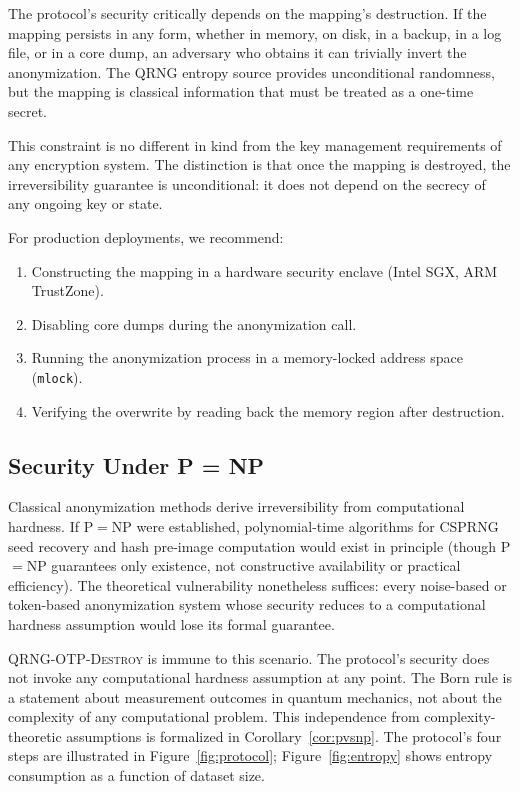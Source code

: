 \documentclass[journal]{IEEEtran}
\begin{document}
The protocol's security critically depends on the mapping's destruction. If the mapping persists in any form, whether in memory, on disk, in a backup, in a log file, or in a core dump, an adversary who obtains it can trivially invert the anonymization. The QRNG entropy source provides unconditional randomness, but the mapping is classical information that must be treated as a one-time secret.

This constraint is no different in kind from the key management requirements of any encryption system. The distinction is that once the mapping is destroyed, the irreversibility guarantee is unconditional: it does not depend on the secrecy of any ongoing key or state.

For production deployments, we recommend:
\begin{enumerate}
\item Constructing the mapping in a hardware security enclave (Intel SGX, ARM TrustZone).
\item Disabling core dumps during the anonymization call.
\item Running the anonymization process in a memory-locked address space (\texttt{mlock}).
\item Verifying the overwrite by reading back the memory region after destruction.
\end{enumerate}

\subsection{Security Under P = NP}
\label{subsec:pnp}

Classical anonymization methods derive irreversibility from computational hardness. If P$=$NP were established, polynomial-time algorithms for CSPRNG seed recovery and hash pre-image computation would exist in principle (though P$=$NP guarantees only existence, not constructive availability or practical efficiency). The theoretical vulnerability nonetheless suffices: every noise-based or token-based anonymization system whose security reduces to a computational hardness assumption would lose its formal guarantee.

\textsc{QRNG-OTP-Destroy} is immune to this scenario. The protocol's security does not invoke any computational hardness assumption at any point. The Born rule is a statement about measurement outcomes in quantum mechanics, not about the complexity of any computational problem. This independence from complexity-theoretic assumptions is formalized in Corollary~\ref{cor:pvsnp}. The protocol's four steps are illustrated in Figure~\ref{fig:protocol}; Figure~\ref{fig:entropy} shows entropy consumption as a function of dataset size.
\end{document}
